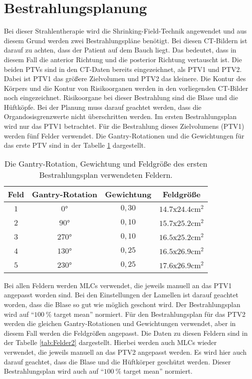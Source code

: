 \section{Bestrahlungsplanung}
\label{sec:Bestrahlungsplanung}
Bei dieser Strahlentherapie wird die Shrinking-Field-Technik angewendet und aus diesem Grund werden zwei Bestrahlungspläne benötigt.
Bei diesen CT-Bildern ist darauf zu achten, dass der Patient auf dem Bauch liegt. Das bedeutet, dass in diesem
Fall die anterior Richtung und die posterior Richtung vertauscht ist.
Die beiden PTVs sind in den CT-Daten bereits eingezeichnet, als PTV1 und PTV2. Dabei ist PTV1 das größere Zielvolumen und PTV2 das kleinere.
Die Kontur des Körpers und die Kontur von Risikoorganen werden in den
vorliegenden CT-Bilder noch eingezeichnet. Risikoorgane bei dieser Bestrahlung sind die Blase und die Hüftköpfe. Bei der Planung muss darauf geachtet
werden, dass die Organdosisgrenzwerte nicht überschritten werden. Im ersten Bestrahlungsplan wird nur das PTV1 betrachtet.
Für die Bestrahlung dieses Zielvolumens (PTV1) werden fünf Felder verwendet.
Die Gantry-Rotationen und die Gewichtungen für das erste PTV sind in der Tabelle \ref{tab:Felder1} dargestellt.

\begin{table}
	\centering
	\caption{Die Gantry-Rotation, Gewichtung und Feldgröße des ersten Bestrahlungsplan verwendeten Feldern.}
	\label{tab:Felder1}
	\begin{tabular}{c c c c}
		\toprule
		Feld & Gantry-Rotation & Gewichtung & Feldgröße\\
		\midrule
		$1$ & $0°$   & $0,30$ & $\num{14.7}$x$\num{24.4} \si{\centi\meter\squared}$ \\
		$2$ & $90°$  & $0,10$ & $\num{15.7}$x$\num{25.2} \si{\centi\meter\squared}$ \\
		$3$ & $270°$ & $0,10$ & $\num{16.5}$x$\num{25.2} \si{\centi\meter\squared}$ \\
		$4$ & $130°$ & $0,25$ & $\num{16.5}$x$\num{26.9} \si{\centi\meter\squared}$ \\
		$5$ & $230°$ & $0,25$ & $\num{17.6}$x$\num{26.9} \si{\centi\meter\squared}$ \\
		\bottomrule
	\end{tabular}
\end{table}

Bei allen Feldern werden MLCs verwendet, die jeweils manuell an das PTV1 angepasst worden sind.
Bei den Einstellungen der Lamellen ist darauf geachtet worden, dass die Blase so gut wie möglich geschont wird.
Der Bestrahlungsplan wird auf \enquote{$\SI{100}{\percent}$ target mean} normiert.
Für den Bestrahlungsplan für das PTV2 werden die gleichen Gantry-Rotationen und Gewichtungen verwendet, aber in diesem Fall werden die Feldgrößen angepasst.
Die Daten zu diesen Feldern sind in der Tabelle \ref{tab:Felder2} dargestellt.
Hierbei werden auch MLCs wieder verwendet, die jeweils manuell an das PTV2 angepasst werden.
Es wird hier auch darauf geachtet, dass die Blase und die Hüftkörper geschützt werden.
Dieser Bestrahlungsplan wird auch auf \enquote{$\SI{100}{\percent}$ target mean} normiert.

